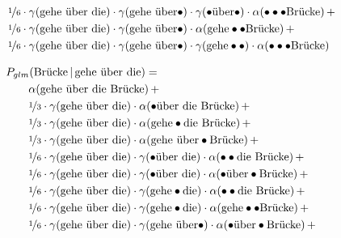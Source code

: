 \documentclass[11pt,a4paper]{article}
\newcommand\givenbase[1][]{\,#1\lvert\,}
\let\given\givenbase
\newcommand{\probSymbol}[1][]{P_{#1}}
\newcommand{\prob}[2][]{\probSymbol[#1](#2)}
\newcommand{\probCond}[3][]{\prob[#1]{#2 \given #3}}
\begin{document}
\begin{equation}
\begin{split}
    &\nicefrac{1}{6} \cdot \gamma(\text{gehe \"uber die}) \cdot \gamma(\text{gehe \"uber}\bullet) \cdot \gamma(\bullet\text{\"uber}\bullet) \cdot \alpha(\bullet\bullet\bullet\text{Br\"ucke}) \, + \\
    &\nicefrac{1}{6} \cdot \gamma(\text{gehe \"uber die}) \cdot \gamma(\text{gehe \"uber}\bullet) \cdot \alpha(\text{gehe}\bullet\bullet\text{Br\"ucke}) \, + \\
    &\nicefrac{1}{6} \cdot \gamma(\text{gehe \"uber die}) \cdot \gamma(\text{gehe \"uber}\bullet) \cdot \gamma(\text{gehe}\bullet\bullet) \cdot \alpha(\bullet\bullet\bullet\text{Br\"ucke})
  \end{split}
\end{equation}

\begin{equation}
  \begin{split}
    &\hspace{-2em}\probCond[glm]{\text{Br\"ucke}}{\text{gehe \"uber die}} = \\
    &\alpha(\text{gehe \"uber die Br\"ucke}) \, + \\
    &\nicefrac{1}{3} \cdot \gamma(\text{gehe \"uber die}) \cdot \alpha(\bullet\text{\"uber die Br\"ucke}) \, + \\
    &\nicefrac{1}{3} \cdot \gamma(\text{gehe \"uber die}) \cdot \alpha(\text{gehe}\bullet\text{die Br\"ucke}) \, + \\
    &\nicefrac{1}{3} \cdot \gamma(\text{gehe \"uber die}) \cdot \alpha(\text{gehe \"uber}\bullet\text{Br\"ucke}) \, + \\
    &\nicefrac{1}{6} \cdot \gamma(\text{gehe \"uber die}) \cdot \gamma(\bullet\text{\"uber die}) \cdot \alpha(\bullet\bullet\text{die Br\"ucke}) \, + \\
    &\nicefrac{1}{6} \cdot \gamma(\text{gehe \"uber die}) \cdot \gamma(\bullet\text{\"uber die}) \cdot \alpha(\bullet\text{\"uber}\bullet\text{Br\"ucke}) \, + \\
    &\nicefrac{1}{6} \cdot \gamma(\text{gehe \"uber die}) \cdot \gamma(\text{gehe}\bullet\text{die}) \cdot \alpha(\bullet\bullet\text{die Br\"ucke}) \, + \\
    &\nicefrac{1}{6} \cdot \gamma(\text{gehe \"uber die}) \cdot \gamma(\text{gehe}\bullet\text{die}) \cdot \alpha(\text{gehe}\bullet\bullet\text{Br\"ucke}) \, + \\
    &\nicefrac{1}{6} \cdot \gamma(\text{gehe \"uber die}) \cdot \gamma(\text{gehe \"uber}\bullet) \cdot \alpha(\bullet\text{\"uber}\bullet\text{Br\"ucke}) \, + \\

\end{split}
\end{equation}
\end{document}
